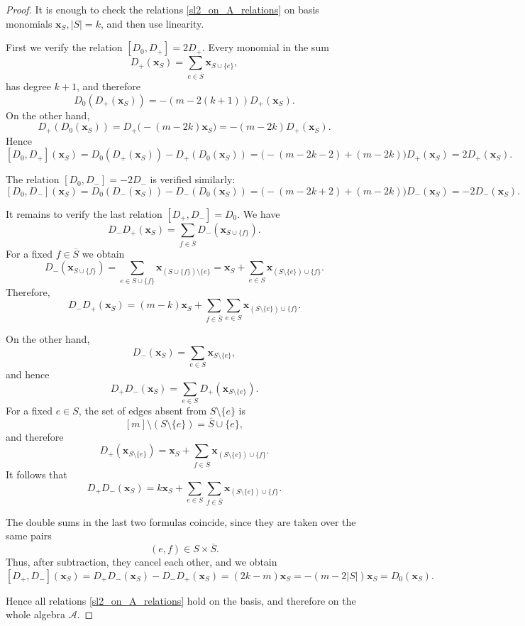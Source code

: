 \documentclass[12pt,reqno]{amsart}
\begin{document}
\begin{proof}
It is enough to check the relations \eqref{sl2_on_A_relations} on basis
monomials $\boldsymbol{x}_S, |S|=k$, and then use linearity.

\smallskip

First we verify the relation
$
[D_0,D_+]=2D_+.
$
Every monomial in the sum
$$
D_+(\boldsymbol{x}_S)=\sum_{e\in\overline S}\boldsymbol{x}_{S\cup\{e\}},
$$
has degree $k+1$, and therefore
$$
D_0(D_+(\boldsymbol{x}_S))=-(m-2(k+1))D_+(\boldsymbol{x}_S).
$$
On the other hand,
$$
D_+(D_0(\boldsymbol{x}_S))=D_+\bigl(-(m-2k)\boldsymbol{x}_S\bigr)=-(m-2k)D_+(\boldsymbol{x}_S).
$$
Hence
$$
[D_0,D_+](\boldsymbol{x}_S)
=
D_0(D_+(\boldsymbol{x}_S))-D_+(D_0(\boldsymbol{x}_S))
=
\bigl(-(m-2k-2)+(m-2k)\bigr)D_+(\boldsymbol{x}_S)
=
2D_+(\boldsymbol{x}_S).
$$

The relation $[D_0,D_-]=-2D_-$ is verified similarly:
$$
[D_0,D_-](\boldsymbol{x}_S)
=
D_0(D_-(\boldsymbol{x}_S))-D_-(D_0(\boldsymbol{x}_S))
=
\bigl(-(m-2k+2)+(m-2k)\bigr)D_-(\boldsymbol{x}_S)
=
-2D_-(\boldsymbol{x}_S).
$$

It remains to verify the last relation
$
[D_+,D_-]=D_0.
$
We have
$$
D_-D_+(\boldsymbol{x}_S)
=
\sum_{f\in\overline S}D_-(\boldsymbol{x}_{S\cup\{f\}}).
$$
For a fixed $f\in\overline S$ we obtain
$$
D_-(\boldsymbol{x}_{S\cup\{f\}})
=
\sum_{e\in S\cup\{f\}}\boldsymbol{x}_{(S\cup\{f\})\setminus\{e\}}
=
\boldsymbol{x}_S+\sum_{e\in S}\boldsymbol{x}_{(S\setminus\{e\})\cup\{f\}}.
$$
Therefore,
$$
D_-D_+(\boldsymbol{x}_S)
=
(m-k)\boldsymbol{x}_S+\sum_{f\in\overline S}\sum_{e\in S}\boldsymbol{x}_{(S\setminus\{e\})\cup\{f\}}.
$$

On the other hand,
$$
D_-(\boldsymbol{x}_S)=\sum_{e\in S}\boldsymbol{x}_{S\setminus\{e\}},
$$
and hence
$$
D_+D_-(\boldsymbol{x}_S)
=
\sum_{e\in S}D_+(\boldsymbol{x}_{S\setminus\{e\}}).
$$
For a fixed $e\in S$, the set of edges absent from $S\setminus\{e\}$ is
$$
[m]\setminus (S\setminus\{e\})=\overline S\cup\{e\},
$$
and therefore
\begin{equation}\label{r2}
D_+(\boldsymbol{x}_{S\setminus\{e\}})
=
\boldsymbol{x}_S+\sum_{f\in\overline S}\boldsymbol{x}_{(S\setminus\{e\})\cup\{f\}}.
\end{equation}
It follows that
$$
D_+D_-(\boldsymbol{x}_S)
=
k\boldsymbol{x}_S+\sum_{e\in S}\sum_{f\in\overline S}\boldsymbol{x}_{(S\setminus\{e\})\cup\{f\}}.
$$

The double sums in the last two formulas coincide, since they are taken over
the same pairs
$$
(e,f)\in S\times\overline S.
$$
Thus, after subtraction, they cancel each other, and we obtain
$$
[D_+,D_-](\boldsymbol{x}_S)
=
D_+D_-(\boldsymbol{x}_S)-D_-D_+(\boldsymbol{x}_S)
=
(2k-m)\boldsymbol{x}_S
=
-(m-2 |S|)\boldsymbol{x}_S
=
D_0(\boldsymbol{x}_S).
$$

Hence all relations \eqref{sl2_on_A_relations} hold on the basis, and
therefore on the whole algebra $\mathcal A$.
\end{proof}
\end{document}
